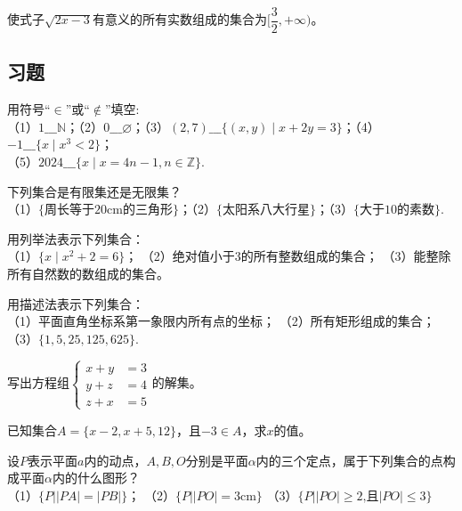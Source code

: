 \documentclass[lang=cn,math=cm,chinesefont=nofont,11pt,scheme=chinese,onecol]{elegantbook}
\begin{document}
\begin{example}
  使式子$\sqrt{2x-3}$有意义的所有实数组成的集合为$[\dfrac{3}{2},+\infty)$。
\end{example}

\subsection{习题}

\begin{exercise}\label{exer:1}
  用符号“$\in$”或“$\notin$”填空:\\
（1）$1\_\_\_\mathbb{N}$；（2）$0\_\_\_\varnothing$；（3）$(2,7)\_\_\_\{(x,y)\mid x+2y=3\}$；（4）$-1\_\_\_\{x\mid x^{3}<2\}$；\\（5）$2024\_\_\_\{x\mid x=4n-1,n\in\mathbb{Z}\}$.
\end{exercise}

\begin{exercise}\label{exer:2}
  下列集合是有限集还是无限集？\\
  （1）$\{\text{周长等于20cm的三角形}\}$；（2）$\{\text{太阳系八大行星}\}$；（3）$\{\text{大于10的素数}\}$.
\end{exercise}

\begin{exercise}\label{exer:3}
  用列举法表示下列集合：\\
  （1）$\{x\mid x^2+2=6\}$；
  （2）绝对值小于3的所有整数组成的集合；
  （3）能整除所有自然数的数组成的集合。
\end{exercise}

\begin{exercise}\label{exer:4}
  用描述法表示下列集合：\\
  （1）平面直角坐标系第一象限内所有点的坐标；
  （2）所有矩形组成的集合；
  （3）$\{1,5,25,125,625\}$.
\end{exercise}

\begin{exercise}\label{exer:5}
  写出方程组$\left.\left\{\begin{aligned}x+y&=3\\y+z&=4\\z+x&=5\end{aligned}\right.\right.$的解集。
\end{exercise}

\begin{exercise}\label{exer:6}
  已知集合$A=\{x-2,x+5,12\}$，且$-3\in A$，求$x$的值。
\end{exercise}

\begin{exercise}\label{exer:7}
  设$P$表示平面$a$内的动点，$A,B,O$分别是平面$\alpha$内的三个定点，属于下列集合的点构成平面$\alpha$内的什么图形？\\
  （1）$\{P||PA|=|PB|\}$；
  （2）$\{P||PO|=3\text{cm}\}$
  （3）$\{P||PO|\geqslant2\text{,且}|PO|\leqslant3\}$
\end{exercise}
\end{document}
